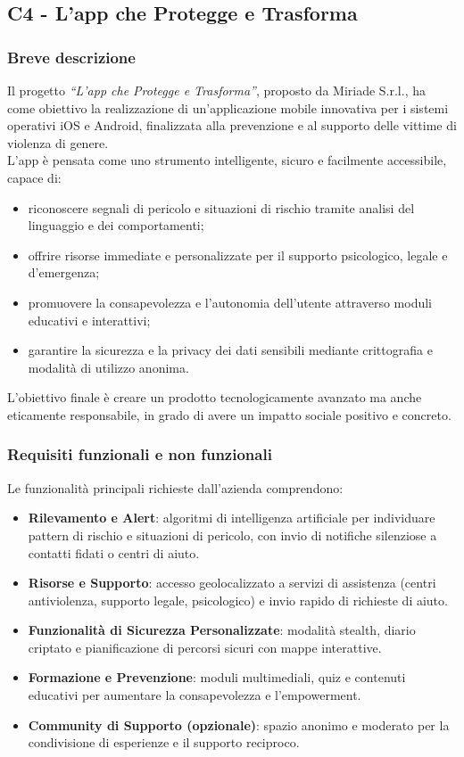 \documentclass[a4paper,11pt]{article}
\begin{document}
\subsection{C4 - L'app che Protegge e Trasforma}
\subsubsection{Breve descrizione}
Il progetto \textit{``L’app che Protegge e Trasforma''}, proposto da Miriade S.r.l., ha come obiettivo la realizzazione di un’applicazione mobile innovativa per i sistemi operativi iOS e Android, finalizzata alla prevenzione e al supporto delle vittime di violenza di genere.\\

L’app è pensata come uno strumento intelligente, sicuro e facilmente accessibile, capace di:
\begin{itemize}
    \item riconoscere segnali di pericolo e situazioni di rischio tramite analisi del linguaggio e dei comportamenti;
    \item offrire risorse immediate e personalizzate per il supporto psicologico, legale e d’emergenza;
    \item promuovere la consapevolezza e l’autonomia dell’utente attraverso moduli educativi e interattivi;
    \item garantire la sicurezza e la privacy dei dati sensibili mediante crittografia e modalità di utilizzo anonima.
\end{itemize}
L’obiettivo finale è creare un prodotto tecnologicamente avanzato ma anche eticamente responsabile, in grado di avere un impatto sociale positivo e concreto.

\subsubsection{Requisiti funzionali e non funzionali}
Le funzionalità principali richieste dall’azienda comprendono:
\begin{itemize}
    \item \textbf{Rilevamento e Alert}: algoritmi di intelligenza artificiale per individuare pattern di rischio e situazioni di pericolo, con invio di notifiche silenziose a contatti fidati o centri di aiuto.
    \item \textbf{Risorse e Supporto}: accesso geolocalizzato a servizi di assistenza (centri antiviolenza, supporto legale, psicologico) e invio rapido di richieste di aiuto.
    \item \textbf{Funzionalità di Sicurezza Personalizzate}: modalità stealth, diario criptato e pianificazione di percorsi sicuri con mappe interattive.
    \item \textbf{Formazione e Prevenzione}: moduli multimediali, quiz e contenuti educativi per aumentare la consapevolezza e l’empowerment.
    \item \textbf{Community di Supporto (opzionale)}: spazio anonimo e moderato per la condivisione di esperienze e il supporto reciproco.
\end{itemize}
\end{document}
